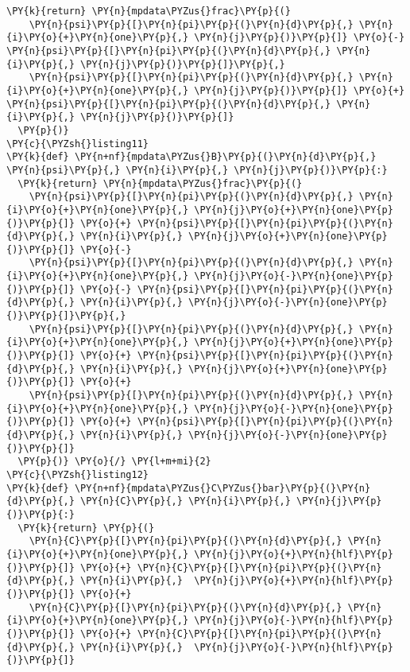 \begin{Verbatim}[commandchars=\\\{\}]
  \PY{k}{return} \PY{n}{mpdata\PYZus{}frac}\PY{p}{(}
    \PY{n}{psi}\PY{p}{[}\PY{n}{pi}\PY{p}{(}\PY{n}{d}\PY{p}{,} \PY{n}{i}\PY{o}{+}\PY{n}{one}\PY{p}{,} \PY{n}{j}\PY{p}{)}\PY{p}{]} \PY{o}{-} \PY{n}{psi}\PY{p}{[}\PY{n}{pi}\PY{p}{(}\PY{n}{d}\PY{p}{,} \PY{n}{i}\PY{p}{,} \PY{n}{j}\PY{p}{)}\PY{p}{]}\PY{p}{,}
    \PY{n}{psi}\PY{p}{[}\PY{n}{pi}\PY{p}{(}\PY{n}{d}\PY{p}{,} \PY{n}{i}\PY{o}{+}\PY{n}{one}\PY{p}{,} \PY{n}{j}\PY{p}{)}\PY{p}{]} \PY{o}{+} \PY{n}{psi}\PY{p}{[}\PY{n}{pi}\PY{p}{(}\PY{n}{d}\PY{p}{,} \PY{n}{i}\PY{p}{,} \PY{n}{j}\PY{p}{)}\PY{p}{]}
  \PY{p}{)}
\PY{c}{\PYZsh{}listing11}
\PY{k}{def} \PY{n+nf}{mpdata\PYZus{}B}\PY{p}{(}\PY{n}{d}\PY{p}{,} \PY{n}{psi}\PY{p}{,} \PY{n}{i}\PY{p}{,} \PY{n}{j}\PY{p}{)}\PY{p}{:}
  \PY{k}{return} \PY{n}{mpdata\PYZus{}frac}\PY{p}{(} 
    \PY{n}{psi}\PY{p}{[}\PY{n}{pi}\PY{p}{(}\PY{n}{d}\PY{p}{,} \PY{n}{i}\PY{o}{+}\PY{n}{one}\PY{p}{,} \PY{n}{j}\PY{o}{+}\PY{n}{one}\PY{p}{)}\PY{p}{]} \PY{o}{+} \PY{n}{psi}\PY{p}{[}\PY{n}{pi}\PY{p}{(}\PY{n}{d}\PY{p}{,} \PY{n}{i}\PY{p}{,} \PY{n}{j}\PY{o}{+}\PY{n}{one}\PY{p}{)}\PY{p}{]} \PY{o}{-}
    \PY{n}{psi}\PY{p}{[}\PY{n}{pi}\PY{p}{(}\PY{n}{d}\PY{p}{,} \PY{n}{i}\PY{o}{+}\PY{n}{one}\PY{p}{,} \PY{n}{j}\PY{o}{-}\PY{n}{one}\PY{p}{)}\PY{p}{]} \PY{o}{-} \PY{n}{psi}\PY{p}{[}\PY{n}{pi}\PY{p}{(}\PY{n}{d}\PY{p}{,} \PY{n}{i}\PY{p}{,} \PY{n}{j}\PY{o}{-}\PY{n}{one}\PY{p}{)}\PY{p}{]}\PY{p}{,}
    \PY{n}{psi}\PY{p}{[}\PY{n}{pi}\PY{p}{(}\PY{n}{d}\PY{p}{,} \PY{n}{i}\PY{o}{+}\PY{n}{one}\PY{p}{,} \PY{n}{j}\PY{o}{+}\PY{n}{one}\PY{p}{)}\PY{p}{]} \PY{o}{+} \PY{n}{psi}\PY{p}{[}\PY{n}{pi}\PY{p}{(}\PY{n}{d}\PY{p}{,} \PY{n}{i}\PY{p}{,} \PY{n}{j}\PY{o}{+}\PY{n}{one}\PY{p}{)}\PY{p}{]} \PY{o}{+}
    \PY{n}{psi}\PY{p}{[}\PY{n}{pi}\PY{p}{(}\PY{n}{d}\PY{p}{,} \PY{n}{i}\PY{o}{+}\PY{n}{one}\PY{p}{,} \PY{n}{j}\PY{o}{-}\PY{n}{one}\PY{p}{)}\PY{p}{]} \PY{o}{+} \PY{n}{psi}\PY{p}{[}\PY{n}{pi}\PY{p}{(}\PY{n}{d}\PY{p}{,} \PY{n}{i}\PY{p}{,} \PY{n}{j}\PY{o}{-}\PY{n}{one}\PY{p}{)}\PY{p}{]}
  \PY{p}{)} \PY{o}{/} \PY{l+m+mi}{2}
\PY{c}{\PYZsh{}listing12}
\PY{k}{def} \PY{n+nf}{mpdata\PYZus{}C\PYZus{}bar}\PY{p}{(}\PY{n}{d}\PY{p}{,} \PY{n}{C}\PY{p}{,} \PY{n}{i}\PY{p}{,} \PY{n}{j}\PY{p}{)}\PY{p}{:}
  \PY{k}{return} \PY{p}{(}
    \PY{n}{C}\PY{p}{[}\PY{n}{pi}\PY{p}{(}\PY{n}{d}\PY{p}{,} \PY{n}{i}\PY{o}{+}\PY{n}{one}\PY{p}{,} \PY{n}{j}\PY{o}{+}\PY{n}{hlf}\PY{p}{)}\PY{p}{]} \PY{o}{+} \PY{n}{C}\PY{p}{[}\PY{n}{pi}\PY{p}{(}\PY{n}{d}\PY{p}{,} \PY{n}{i}\PY{p}{,}  \PY{n}{j}\PY{o}{+}\PY{n}{hlf}\PY{p}{)}\PY{p}{]} \PY{o}{+}
    \PY{n}{C}\PY{p}{[}\PY{n}{pi}\PY{p}{(}\PY{n}{d}\PY{p}{,} \PY{n}{i}\PY{o}{+}\PY{n}{one}\PY{p}{,} \PY{n}{j}\PY{o}{-}\PY{n}{hlf}\PY{p}{)}\PY{p}{]} \PY{o}{+} \PY{n}{C}\PY{p}{[}\PY{n}{pi}\PY{p}{(}\PY{n}{d}\PY{p}{,} \PY{n}{i}\PY{p}{,}  \PY{n}{j}\PY{o}{-}\PY{n}{hlf}\PY{p}{)}\PY{p}{]} 

\end{Verbatim}
